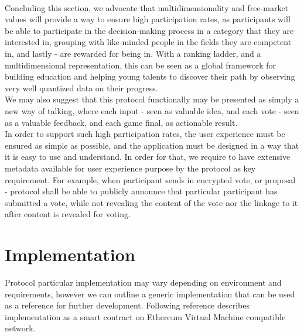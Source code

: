 \documentclass{article}
\begin{document}
\begin{CJK}{UTF8}{gbsn}
\begin{multicols}{2}
        \paragraph{}

        Concluding this section, we advocate that multidimensionality and free-market values will provide a way to ensure high participation rates, as participants will be able to participate in the decision-making process in a category that they are interested in, grouping with like-minded people in the fields they are competent in, and lastly - are rewarded for being in.
        With a ranking ladder, and a multidimensional representation, this can be seen as a global framework for building education and helping young talents to discover their path by observing very well quantized data on their progress. \\ We may also suggest that this protocol functionally may be presented as simply a new way of talking, where each input - seen as valuable idea, and each vote - seen as a valuable feedback, and each game final, as actionable result.\\
        In order to support such high participation rates, the user experience must be ensured as simple as possible, and the application must be designed in a way that it is easy to use and understand. In order for that, we require to have extensive metadata available for user experience purpose by the protocol as key requirement. For example, when participant sends in encrypted vote, or proposal - protocol shall be able to publicly announce that particular participant has submitted a vote, while not revealing the content of the vote nor the linkage to it after content is revealed for voting.\\





        \section{Implementation}
        Protocol particular implementation may vary depending on environment and requirements, however we can outline a generic implementation that can be used as a reference for further development. Following reference describes implementation as a smart contract on Ethereum Virtual Machine compatible network. \\


\end{multicols}
\end{CJK}
\end{document}
